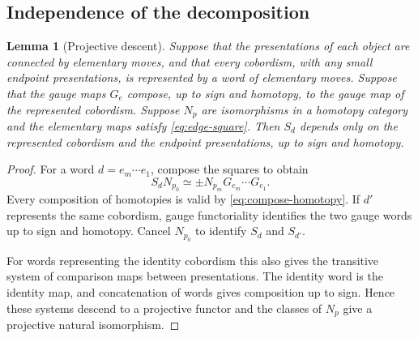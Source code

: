 \documentclass[11pt]{amsart}
\newtheorem{lemma}[theorem]{Lemma}
\theoremstyle{definition}
\theoremstyle{remark}
\theoremstyle{plain}
\numberwithin{equation}{section}
\begin{document}
\subsection{Independence of the decomposition}
\begin{lemma}[Projective descent]\label{lem:descent}
Suppose that the presentations of each object
are connected by elementary moves, and that
every cobordism, with any small endpoint
presentations, is represented by a word of
elementary moves. Suppose that the gauge maps
$G_e$ compose, up to sign and homotopy, to the
gauge map of the represented cobordism. Suppose $N_p$ are
isomorphisms in a homotopy
category and the elementary
maps satisfy
\eqref{eq:edge-square}. Then
$S_d$ depends only on the
represented cobordism and the
endpoint presentations, up to
sign and homotopy.
\end{lemma}
\begin{proof}
For a word $d=e_m\cdots e_1$,
compose the squares to obtain
\[
 S_dN_{p_0}\simeq
     \pm N_{p_m}G_{e_m}\cdots G_{e_1}.
\]
Every composition of homotopies
is valid by
\eqref{eq:compose-homotopy}.
If $d'$ represents the same
cobordism, gauge functoriality
identifies the two gauge words
up to sign and homotopy. Cancel
$N_{p_0}$ to identify $S_d$
and $S_{d'}$.

For words representing the
identity cobordism this also
gives the transitive system of
comparison maps between
presentations. The identity
word is the identity map, and
concatenation of words gives
composition up to sign. Hence
these systems descend to a
projective functor and the
classes of $N_p$ give a
projective natural isomorphism.
\end{proof}
\end{document}
